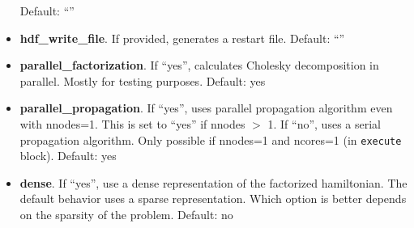 \begin{itemize}
    Default: ``''
\item \textbf{hdf\_write\_file}. If provided, generates a restart file.
    Default: ``''
\item \textbf{parallel\_factorization}. If ``yes'', calculates Cholesky decomposition in parallel. Mostly for testing purposes.
    Default: yes
\item \textbf{parallel\_propagation}. If ``yes'', uses parallel propagation algorithm even with nnodes=1. This is set to ``yes'' if nnodes $>$ 1. If ``no'', uses a serial propagation algorithm. Only possible if nnodes=1 and ncores=1 (in \texttt{execute} block).
    Default: yes
\item \textbf{dense}. If ``yes'', use a dense representation of the factorized hamiltonian. The default behavior uses a sparse representation. Which option is better depends on the sparsity of the problem.
    Default:  no \\
\end{itemize}

